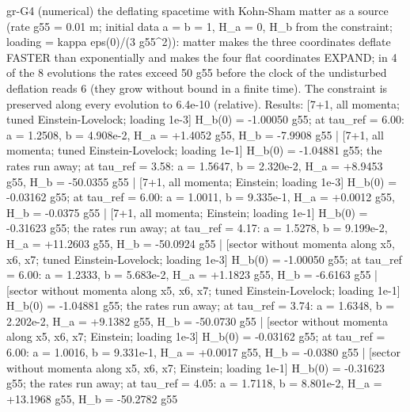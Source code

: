 \documentclass[
  10pt,
]{article}
\newenvironment{Shaded}{}{}
\newcommand{\NormalTok}[1]{#1}
\begin{document}
\begin{Shaded}
\begin{Highlighting}[]
\NormalTok{[PASS] gr{-}G4  (numerical) the deflating spacetime with Kohn{-}Sham matter as a source (rate g55 = 0.01 m; initial data a = b = 1, H\_a = 0, H\_b from the constraint; loading = kappa eps(0)/(3 g55\^{}2)): matter makes the three coordinates deflate FASTER than exponentially and makes the four flat coordinates EXPAND; in 4 of the 8 evolutions the rates exceed 50 g55 before the clock of the undisturbed deflation reads 6 (they grow without bound in a finite time). The constraint is preserved along every evolution to 6.4e{-}10 (relative). Results: [7+1, all momenta; tuned Einstein{-}Lovelock; loading 1e{-}3] H\_b(0) = {-}1.00050 g55; at tau\_ref = 6.00: a = 1.2508, b = 4.908e{-}2, H\_a = +1.4052 g55, H\_b = {-}7.9908 g55 | [7+1, all momenta; tuned Einstein{-}Lovelock; loading 1e{-}1] H\_b(0) = {-}1.04881 g55; the rates run away; at tau\_ref = 3.58: a = 1.5647, b = 2.320e{-}2, H\_a = +8.9453 g55, H\_b = {-}50.0355 g55 | [7+1, all momenta; Einstein; loading 1e{-}3] H\_b(0) = {-}0.03162 g55; at tau\_ref = 6.00: a = 1.0011, b = 9.335e{-}1, H\_a = +0.0012 g55, H\_b = {-}0.0375 g55 | [7+1, all momenta; Einstein; loading 1e{-}1] H\_b(0) = {-}0.31623 g55; the rates run away; at tau\_ref = 4.17: a = 1.5278, b = 9.199e{-}2, H\_a = +11.2603 g55, H\_b = {-}50.0924 g55 | [sector without momenta along x5, x6, x7; tuned Einstein{-}Lovelock; loading 1e{-}3] H\_b(0) = {-}1.00050 g55; at tau\_ref = 6.00: a = 1.2333, b = 5.683e{-}2, H\_a = +1.1823 g55, H\_b = {-}6.6163 g55 | [sector without momenta along x5, x6, x7; tuned Einstein{-}Lovelock; loading 1e{-}1] H\_b(0) = {-}1.04881 g55; the rates run away; at tau\_ref = 3.74: a = 1.6348, b = 2.202e{-}2, H\_a = +9.1382 g55, H\_b = {-}50.0730 g55 | [sector without momenta along x5, x6, x7; Einstein; loading 1e{-}3] H\_b(0) = {-}0.03162 g55; at tau\_ref = 6.00: a = 1.0016, b = 9.331e{-}1, H\_a = +0.0017 g55, H\_b = {-}0.0380 g55 | [sector without momenta along x5, x6, x7; Einstein; loading 1e{-}1] H\_b(0) = {-}0.31623 g55; the rates run away; at tau\_ref = 4.05: a = 1.7118, b = 8.801e{-}2, H\_a = +13.1968 g55, H\_b = {-}50.2782 g55}

\end{Highlighting}
\end{Shaded}
\end{document}
